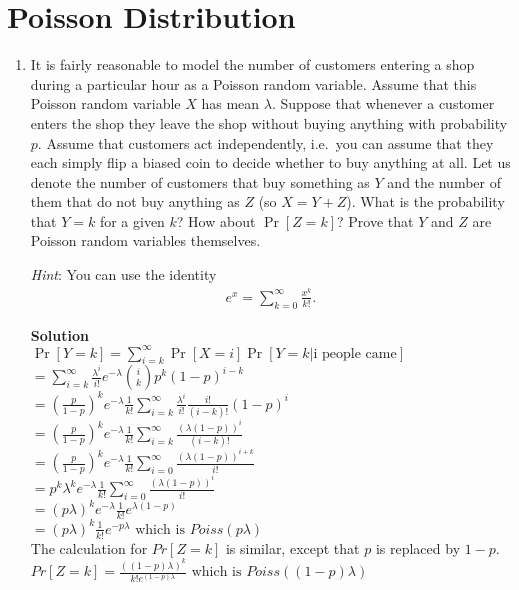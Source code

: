 \documentclass[11pt]{article}
\newcommand*{\Question}[1]{\section{#1}}
\newenvironment{Parts}{\begin{enumerate}[label=(\alph*)]}{\end{enumerate}}
\newcommand*{\Part}{\item}
\begin{document}
\Question{Poisson Distribution}

\begin{Parts}
	\Part  It is fairly reasonable to model the number of customers entering a shop during a particular hour as a Poisson random variable. Assume that this Poisson random variable $X$ has mean $\lambda$. Suppose that whenever a customer enters the shop they leave the shop without buying anything with probability $p$. Assume that customers act independently, i.e.~you can assume that they each simply flip a biased coin to decide whether to buy anything at all. Let us denote the number of customers that buy something as $Y$ and the number of them that do not buy anything as $Z$ (so $X = Y+Z$). 
	What is the probability that $Y=k$ for a given $k$? How about $\Pr[Z=k]$? Prove that $Y$ and $Z$ are Poisson random variables themselves.

	\textit{Hint}: You can use the identity
	\begin{align*}
	    e^x=\sum_{k=0}^{\infty}\frac{x^k}{k!}.
	\end{align*}
\begin{mdframed} \textbf{Solution} \\
$\Pr[Y=k]=\sum_{i=k}^{\infty}\Pr[X=i]\Pr[Y=k|\text{i people came}]$ \\
$=\sum_{i=k}^{\infty}\frac{\lambda^i}{i!}e^{-\lambda}\binom{i}{k}p^k(1-p)^{i-k}$ \\
$=(\frac{p}{1-p})^{k}e^{-\lambda}\frac{1}{k!}\sum_{i=k}^{\infty}\frac{\lambda^i}{i!}\frac{i!}{(i-k)!}(1-p)^{i}$ \\
$=(\frac{p}{1-p})^{k}e^{-\lambda}\frac{1}{k!}\sum_{i=k}^{\infty}\frac{(\lambda(1-p))^i}{(i-k)!}$ \\
$=(\frac{p}{1-p})^{k}e^{-\lambda}\frac{1}{k!}\sum_{i=0}^{\infty}\frac{(\lambda(1-p))^{i+k}}{i!}$ \\
$=p^{k}\lambda^{k}e^{-\lambda}\frac{1}{k!}\sum_{i=0}^{\infty}\frac{(\lambda(1-p))^{i}}{i!}$ \\
$=(p\lambda)^{k}e^{-\lambda}\frac{1}{k!}e^{\lambda(1-p)}$ \\
$=(p\lambda)^{k}\frac{1}{k!}e^{-p\lambda} \text{ which is } Poiss(p\lambda)$ \\
The calculation for $Pr[Z=k]$ is similar, except that $p$ is replaced by $1-p$. \\
$Pr[Z=k]=\frac{((1-p)\lambda)^k}{k!e^{(1-p)\lambda}} \text{ which is } Poiss((1-p)\lambda)$
\end{mdframed}


\end{Parts}
\end{document}

